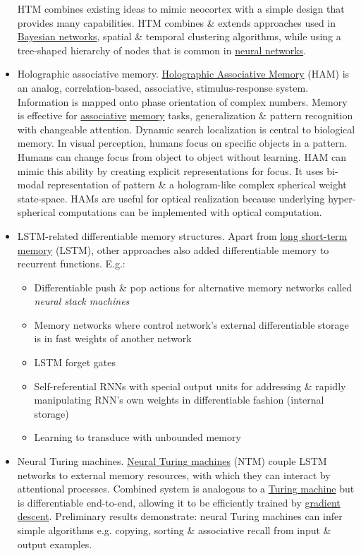 \documentclass{article}
\begin{document}
\begin{itemize}
	HTM combines existing ideas to mimic neocortex with a simple design that provides many capabilities. HTM combines \& extends approaches used in \href{https://en.wikipedia.org/wiki/Bayesian_networks}{Bayesian networks}, spatial \& temporal clustering algorithms, while using a tree-shaped hierarchy of nodes that is common in \href{https://en.wikipedia.org/wiki/Neural_networks}{neural networks}.
	\item {\sf Holographic associative memory.} \href{https://en.wikipedia.org/wiki/Holographic_associative_memory}{Holographic Associative Memory} (HAM) is an analog, correlation-based, associative, stimulus-response system. Information is mapped onto phase orientation of complex numbers. Memory is effective for \href{https://en.wikipedia.org/wiki/Association_(psychology)}{associative} \href{https://en.wikipedia.org/wiki/Memory}{memory} tasks, generalization \& pattern recognition with changeable attention. Dynamic search localization is central to biological memory. In visual perception, humans focus on specific objects in a pattern. Humans can change focus from object to object without learning. HAM can mimic this ability by creating explicit representations for focus. It uses bi-modal representation of pattern \& a hologram-like complex spherical weight state-space. HAMs are useful for optical realization because underlying hyper-spherical computations can be implemented with optical computation.
	\item {\sf LSTM-related differentiable memory structures.} Apart from \href{https://en.wikipedia.org/wiki/Long_short-term_memory}{long short-term memory} (LSTM), other approaches also added differentiable memory to recurrent functions. E.g.:
	\begin{itemize}
		\item Differentiable push \& pop actions for alternative memory networks called {\it neural stack machines}
		\item Memory networks where control network's external differentiable storage is in fast weights of another network
		\item LSTM forget gates
		\item Self-referential RNNs with special output units for addressing \& rapidly manipulating RNN's own weights in differentiable fashion (internal storage)
		\item Learning to transduce with unbounded memory
	\end{itemize}
	\item {\sf Neural Turing machines.} \href{https://en.wikipedia.org/wiki/Neural_Turing_machine}{Neural Turing machines} (NTM) couple LSTM networks to external memory resources, with which they can interact by attentional processes. Combined system is analogous to a \href{https://en.wikipedia.org/wiki/Turing_machine}{Turing machine} but is differentiable end-to-end, allowing it to be efficiently trained by \href{https://en.wikipedia.org/wiki/Gradient_descent}{gradient descent}. Preliminary results demonstrate: neural Turing machines can infer simple algorithms e.g. copying, sorting \& associative recall from input \& output examples.
	

\end{itemize}
\end{document}

